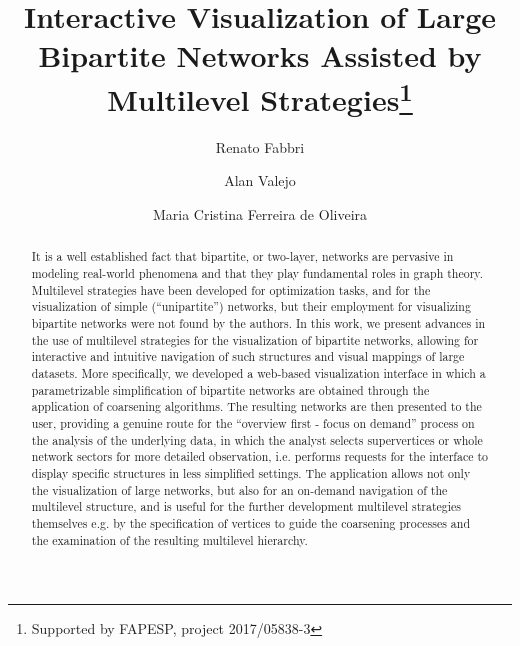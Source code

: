 \documentclass[runningheads]{llncs}
\begin{document}
%
\title{Interactive Visualization of Large Bipartite Networks Assisted by Multilevel Strategies\thanks{Supported by FAPESP, project 2017/05838-3}}
%
%
\author{Renato Fabbri \and
Alan Valejo \and
Maria Cristina Ferreira de Oliveira}
%
%
%
\maketitle
%
\begin{abstract}
  It is a well established fact that bipartite, or two-layer, networks are pervasive
  in modeling real-world phenomena and that they play fundamental roles in
  graph theory.
  Multilevel strategies have been developed for optimization tasks,
  and for the visualization of simple (``unipartite'') networks,
  but their employment for visualizing bipartite networks were not found by the authors.
  In this work, we present advances in the use of multilevel strategies for the
  visualization of bipartite networks,
  allowing for interactive and intuitive navigation of such structures and visual mappings of large datasets.
  More specifically, we developed a web-based visualization interface in which
  a parametrizable simplification of
  bipartite networks are obtained through the application of coarsening algorithms.
  The resulting networks are then presented to the user,
  providing a genuine route for the ``overview first - focus on demand''
  process on the analysis of the underlying data, in which the analyst
  selects supervertices or whole network sectors for more detailed observation,
  i.e. performs requests for the interface to display 
  specific structures in less simplified settings.
  The application allows not only the visualization of large networks,
  but also for an on-demand navigation of the multilevel structure,
  and is useful for the further development multilevel strategies themselves
  e.g. by the specification of vertices to guide the coarsening processes and
  the examination of the resulting multilevel hierarchy.

\end{abstract}
%
\end{document}
